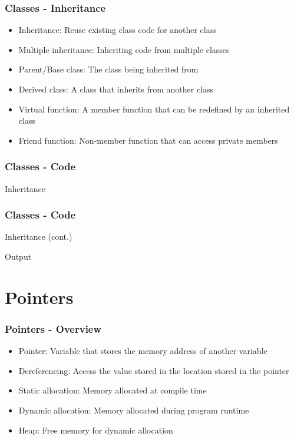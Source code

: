 \documentclass[c, aspectratio=169]{beamer}
\begin{document}
\begin{frame}\frametitle{Classes - Inheritance}
\begin{itemize}
\item Inheritance: Reuse existing class code for another class
\item Multiple inheritance: Inheriting code from multiple classes
\item Parent/Base class: The class being inherited from
\item Derived class: A class that inherits from another class
\item Virtual function: A member function that can be redefined by an inherited class
\item Friend function: Non-member function that can access private members
\end{itemize}
\end{frame}

\begin{frame}\frametitle{Classes - Code}
Inheritance


\end{frame}

\begin{frame}[fragile]\frametitle{Classes - Code}
Inheritance (cont.)
\begin{center}

\end{center}

Output

\end{frame}

\section{Pointers}
\begin{frame}\frametitle{Pointers - Overview}
\begin{itemize}
\item Pointer: Variable that stores the memory address of another variable
\item Dereferencing: Access the value stored in the location stored in the pointer
\item Static allocation: Memory allocated at compile time
\item Dynamic allocation: Memory allocated during program runtime
\item Heap: Free memory for dynamic allocation
\end{itemize}
\end{frame}
\end{document}
